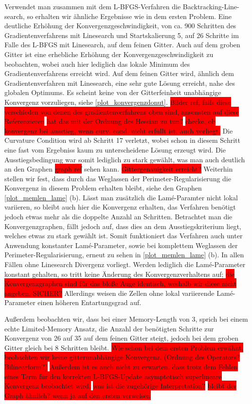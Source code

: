 Verwendet man zusammen mit dem L-BFGS-Verfahren die Backtracking-Line-
search, so erhalten wir ähnliche Ergebnisse wie in dem ersten Problem. Eine deutliche Erhöhung der Konvergenzgeschwindigkeit, von ca. 900 Schritten des Gradientenverfahrens mit Linesearch und Startskalierung 5, auf 26 Schritte im Falle des L-BFGS mit Linesearch, auf dem feinen Gitter. Auch auf dem groben Gitter ist eine erhebliche Erhöhung der Konvergenzgeschwindigkeit zu beobachten, wobei auch hier lediglich das lokale Minimum des Gradientenverfahrens erreicht wird. Auf dem feinen Gitter wird, ähnlich dem Gradientenverfahren mit Linesearch, eine sehr gute Lösung erreicht, nahe des globalen Optimums. Es scheint keine von der Gitterfeinheit unabhängige Konvergenz vorzuliegen, siehe \ref{plot_konvergenzdonut}. \colorbox{red}{Bilder ref, falls diese verschieden von denen des gradientenverfahrens oben sind, ansonsten auf diese Referenzieren} \colorbox{red}{hat das mit der Ordnung des Hessian zu tun?}
\colorbox{red}{checke, ob konvergenz bei ausstieg, wenn curv. cond. nicht erfüllt ist, auch vorliegt.}
Die Curvature Condition wird ab Schritt 17 verletzt, wobei schon in diesem Schritt eine fast vom Ergebniss kaum zu unterscheidene Lösung erzeugt wird. Die Ausstiegsbedingung war somit lediglich zu stark gewählt, was man auch deutlich an den Graphen \colorbox{red}{graph ref} sehen kann. 
\colorbox{red}{Gittergenauigkeit erreicht?}
Weiterhin stellen wir fest, dass durch das Weglassen der Perimeter-Regularisierung die Konvergenz in diesem Problem erhalten bleibt, siehe den Graphen \ref{plot_memlen_lame} (b). Lässt man zusätzlich die Lamé-Paramter nicht lokal variieren, so bleibt auch hier die Konvergenz erhalten, das Verfahren benötigt jedoch etwas mehr als die doppelte Anzahl an Schritten. Betrachtet man die Konvergenzgraphen, fällt jedoch auf, dass dies an dem Ausstiegskriterium liegt, welches etwas zu stark gewählt ist. Somit funktioniert das Verfahren auch unter Anwendung konstanter Lamé-Parameter, sowie bei komplettem Weglassen der Perimeter-Regularisierung, erneut zu sehen in \ref{plot_memlen_lame} (b). In allen Fällen ohne Linesearch Divergenz vorliegt. Werden lediglich die Lamé-Parameter konstant gehalten, so tritt keine Änderung des Konvergenzverhaltens auf; \colorbox{red}{die Konvergenzgraphen sind für das bloße Auge identisch, weshalb wir diese nicht angeben. SICHER?} Allerdings weisen die Zellen ohne lokal variierende Lamé-Parameter einen höheren Entartungsgrad auf.

Außerdem beobachten wir, dass bei einer Memory-Length von 3, sprich bei einem echte Limited-Memory Ansatz, die Anzahl der benötigten Schritte zur Konvergenz von 26 auf 35 auf dem feinen Gitter steigt, jedoch bei dem groben Gitter gleich bei 8 Schritten bleibt.
\colorbox{red}{Wie schon bei dem ersten Problem erwähnt, beobachten wir keine gitterunabhängige Konvergenz. (Ordnung des Operators? Bilinearform?)}
\colorbox{red}{Außerdem ist es auch nicht zu erwarten, dass trotz dem Fehlen eines Term für den korrekten L-BFGS-Update asymptotisch superlineare Konvergenz beobachtet wird.}
\colorbox{red}{was ist die zugehörige Interpretation?} 
\colorbox{red}{bleibt der Graph ähnlich? wenn ja auf den ersten verweisen}

